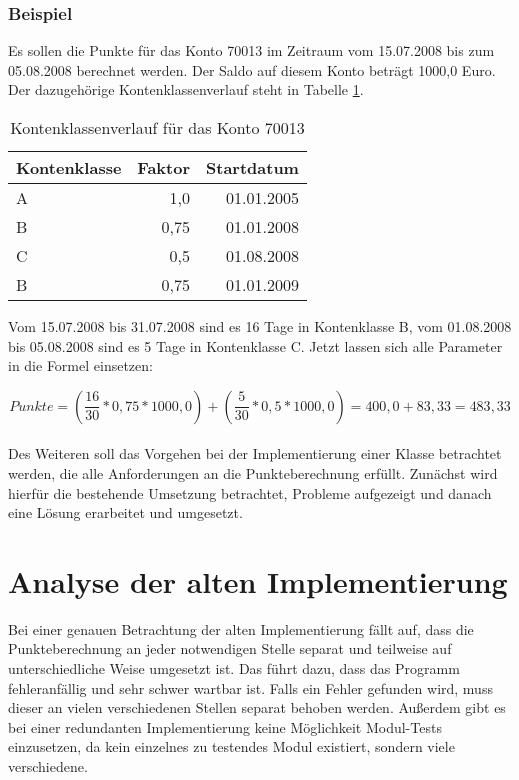 \documentclass[12pt]{scrreprt}
\begin{document}
\subsubsection{Beispiel}
Es sollen die Punkte für das Konto 70013 im Zeitraum vom 15.07.2008 bis zum 05.08.2008 berechnet werden. Der Saldo auf diesem Konto beträgt 1000,0 Euro. Der dazugehörige Kontenklassenverlauf steht in Tabelle \ref{kklverlauf}.

\begin{table}
  \begin{center}
    \begin{tabular}{|l|r|r|}
      \hline
      \textbf{Kontenklasse} & \textbf{Faktor} & \textbf{Startdatum}\\
      \hline
      A & 1,0 & 01.01.2005\\
      \hline
      B & 0,75 & 01.01.2008\\
      \hline
      C & 0,5 & 01.08.2008\\
      \hline
      B & 0,75 & 01.01.2009\\
      \hline
    \end{tabular}
    \caption{Kontenklassenverlauf für das Konto 70013}
    \label{kklverlauf}
  \end{center}
\end{table}
\vspace{2mm}

Vom 15.07.2008 bis 31.07.2008 sind es 16 Tage in Kontenklasse B, vom 01.08.2008 bis 05.08.2008 sind es  5 Tage in Kontenklasse C. Jetzt lassen sich alle Parameter in die Formel einsetzen:

\begin{equation*}
  Punkte = \left(\frac{16}{30} * 0,75 * 1000,0\right) + \left(\frac{5}{30} * 0,5 * 1000,0\right) = 400,0 + 83,33 = 483,33
\end{equation*} \\

Des Weiteren soll das Vorgehen bei der Implementierung einer Klasse betrachtet werden, die alle Anforderungen an die Punkteberechnung erfüllt. Zunächst wird hierfür die bestehende Umsetzung betrachtet, Probleme aufgezeigt und danach eine Lösung erarbeitet und umgesetzt.

\newpage

\section{Analyse der alten Implementierung}
Bei einer genauen Betrachtung der alten Implementierung fällt auf, dass die Punkteberechnung an jeder notwendigen Stelle separat und teilweise auf unterschiedliche Weise umgesetzt ist. Das führt dazu, dass das Programm fehleranfällig und sehr schwer wartbar ist. Falls ein Fehler gefunden wird, muss dieser an vielen verschiedenen Stellen separat behoben werden. Außerdem gibt es bei einer redundanten Implementierung keine Möglichkeit Modul-Tests einzusetzen, da kein einzelnes zu testendes Modul existiert, sondern viele verschiedene. \\
\end{document}
